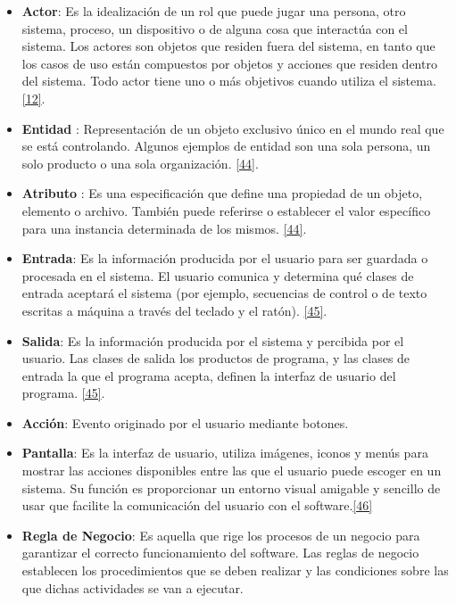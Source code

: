 \begin{itemize}
\item \textbf{Actor}: Es la idealización de un rol que puede jugar una persona, otro sistema, proceso, un dispositivo o de alguna cosa que interactúa con el sistema. Los actores son objetos que residen fuera del sistema, en tanto que los casos de uso están compuestos por objetos y acciones que residen dentro del sistema. Todo actor tiene uno o más objetivos cuando utiliza el sistema.  \hyperlink{b12}{[12]}. 

\item \textbf{Entidad} : Representación de un objeto exclusivo único en el mundo real que se está controlando. Algunos ejemplos de entidad son una sola persona, un solo producto o una sola organización. \hyperlink{b44}{[44]}.

\item \textbf{Atributo} : Es una especificación que define una propiedad de un objeto, elemento o archivo. También puede referirse o establecer el valor específico para una instancia determinada de los mismos. \hyperlink{b44}{[44]}.

\item \textbf{Entrada}: Es la información producida por el usuario para ser guardada o procesada en el sistema. El usuario comunica y determina qué clases de entrada aceptará el sistema (por ejemplo, secuencias de control o de texto escritas a máquina a través del teclado y el ratón). \hyperlink{b45}{[45]}.

\item \textbf{Salida}: Es la información producida por el sistema y percibida por el usuario. Las clases de salida los productos de programa, y las clases de entrada la que el programa acepta, definen la interfaz de usuario del programa. \hyperlink{b45}{[45]}.

\item \textbf{Acción}: Evento originado por el usuario mediante botones.

\item \textbf{Pantalla}: Es la interfaz de usuario, utiliza imágenes, iconos y menús para mostrar las acciones disponibles entre las que el usuario puede escoger en un sistema. Su función es proporcionar un entorno visual amigable y sencillo de usar que facilite la comunicación del usuario con el software.\hyperlink{b46}{[46]}

\item \textbf{Regla de Negocio}: Es aquella que rige los procesos de un negocio para garantizar el correcto funcionamiento del software. Las reglas de negocio establecen los procedimientos que se deben realizar y las condiciones sobre las que dichas actividades se van a ejecutar.


\end{itemize}
